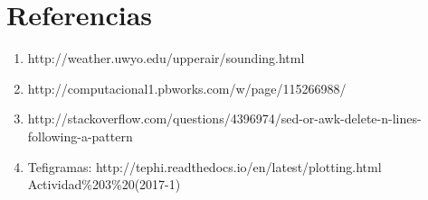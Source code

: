 \documentclass[12pt]{article}
\begin{document}
\section{Referencias}
\begin{enumerate}
\item http://weather.uwyo.edu/upperair/sounding.html
\item http://computacional1.pbworks.com/w/page/115266988/
\item  http://stackoverflow.com/questions/4396974/sed-or-awk-delete-n-lines-following-a-pattern
\item Tefigramas: http://tephi.readthedocs.io/en/latest/plotting.html
\\Actividad\%203\%20(2017-1) 
\end{enumerate}
\end{document}
